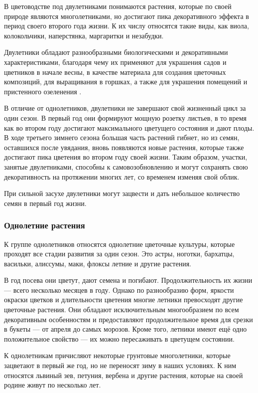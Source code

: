 В цветоводстве под двулетниками понимаются растения, которые по своей природе являются многолетниками, но достигают пика декоративного эффекта в период своего второго года жизни. К их числу относятся такие виды, как виола, колокольчики, наперстянка, маргаритки и незабудки.

Двулетники обладают разнообразными биологическими и декоративными характеристиками, благодаря чему их применяют для украшения садов и цветников в начале весны, в качестве материала для создания цветочных композиций, для выращивания в горшках, а также для украшения помещений и пристенного озеленения \cite{aldohinaFlower}.

В отличие от однолетников, двулетники не завершают свой жизненный цикл за один сезон. В первый год они формируют мощную розетку листьев, в то время как во втором году достигают максимального цветущего состояния и дают плоды. В ходе третьего зимнего сезона большая часть растений гибнет, но из семян, оставшихся после увядания, вновь появляются новые растения, которые также достигают пика цветения во втором году своей жизни. Таким образом, участки, занятые двулетниками, способны к самовозобновлению и могут сохранять свою декоративность на протяжении многих лет, со временем изменяя свой облик.

При сильной засухе двулетники могут зацвести и дать небольшое количество семян в первый год жизни.

\subsubsection{Однолетние растения}

К группе однолетников относятся однолетние цветочные культуры, которые проходят все стадии развития за один сезон. Это астры, ноготки, бархатцы, васильки, алиссумы, маки, флоксы летние и другие растения.

В год посева они цветут, дают семена и погибают. Продолжительность их жизни — всего несколько месяцев в году. Однако по разнообразию форм, яркости окраски цветков и длительности цветения многие летники превосходят другие цветочные растения. Они обладают исключительным многообразием по всем декоративным особенностям и предоставляют продолжительное время  для срезки в букеты — от апреля до самых морозов. Кроме того, летники имеют ещё одно положительное свойство — их можно пересаживать в цветущем состоянии.

К однолетникам причисляют некоторые грунтовые многолетники, которые зацветают в первый же год, но не переносят зиму в наших условиях. К ним относятся львиный зев, петуния, вербена и другие растения, которые на своей родине живут по несколько лет.

